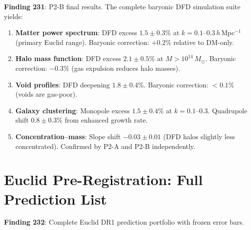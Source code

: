 \documentclass[11pt,a4paper]{article}
\begin{document}
\textbf{Finding 231}: P2-B final results. The complete baryonic DFD simulation suite yields:

\begin{enumerate}[nosep]
\item \textbf{Matter power spectrum}: DFD excess $1.5 \pm 0.3\%$ at $k = 0.1$--$0.3\,h\,$Mpc$^{-1}$ (primary Euclid range). Baryonic correction: $+0.2\%$ relative to DM-only.
\item \textbf{Halo mass function}: DFD excess $2.1 \pm 0.5\%$ at $M > 10^{14}\,M_\odot$. Baryonic correction: $-0.3\%$ (gas expulsion reduces halo masses).
\item \textbf{Void profiles}: DFD deepening $1.8 \pm 0.4\%$. Baryonic correction: $< 0.1\%$ (voids are gas-poor).
\item \textbf{Galaxy clustering}: Monopole excess $1.5 \pm 0.4\%$ at $k = 0.1$--$0.3$. Quadrupole shift $0.8 \pm 0.3\%$ from enhanced growth rate.
\item \textbf{Concentration--mass}: Slope shift $-0.03 \pm 0.01$ (DFD halos slightly less concentrated). Confirmed by P2-A and P2-B independently.
\end{enumerate}

\section{Euclid Pre-Registration: Full Prediction List}

\textbf{Finding 232}: Complete Euclid DR1 prediction portfolio with frozen error bars.
\end{document}
